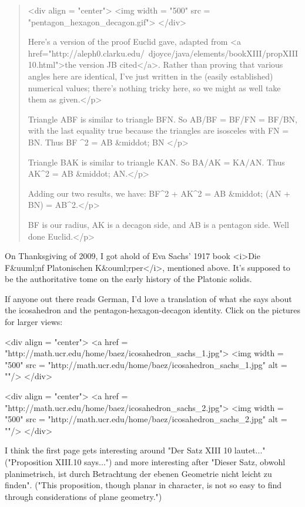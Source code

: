 \begin{quote}

<div align = "center">
<img width = "500" src = "pentagon_hexagon_decagon.gif">
</div>

Here's a version of the proof Euclid gave, adapted from <a
href="http://aleph0.clarku.edu/~djoyce/java/elements/bookXIII/propXIII10.html">the version JB cited</a>.  Rather than proving that various angles here
are identical, I've just written in the (easily established) numerical
values; there's nothing tricky here, so we might as well take them as
given.</p>


Triangle ABF is similar to triangle BFN.  So AB/BF = BF/FN = BF/BN, 
with the last equality true because the triangles are isosceles with 
FN = BN.  Thus BF ^{2} = AB &middot; BN </p>


Triangle BAK is similar to triangle KAN.  
So BA/AK = KA/AN.  Thus AK^{2} = AB &middot; AN.</p>


Adding our two results, we have:
BF^{2} + AK^{2} = AB &middot; (AN + BN) = AB^{2}.</p>


BF is our radius, AK is a decagon side, and AB is a pentagon
side. Well done Euclid.</p>

\end{quote}

On Thanksgiving of 2009, I got ahold of Eva Sachs' 1917 book <i>Die
F&uuml;nf Platonischen K&ouml;rper</i>, mentioned above.  It's
supposed to be the authoritative tome on the early history of the
Platonic solids.

If anyone out there reads German, I'd love a translation of what she says
about the icosahedron and the pentagon-hexagon-decagon identity.  Click on
the pictures for larger views:

<div align = "center">
<a href = "http://math.ucr.edu/home/baez/icosahedron_sachs_1.jpg">
<img width = "500" src = "http://math.ucr.edu/home/baez/icosahedron_sachs_1.jpg" alt = ""/>
</div>

<div align = "center">
<a href = "http://math.ucr.edu/home/baez/icosahedron_sachs_2.jpg">
<img width = "500" src = "http://math.ucr.edu/home/baez/icosahedron_sachs_2.jpg" alt =
""/>
</div>

I think the first page gets interesting around "Der Satz XIII 10 lautet..."
("Proposition XIII.10 says...") and more interesting after "Dieser Satz,
obwohl planimetrisch, ist durch Betrachtung der ebenen Geometrie nicht
leicht zu finden". ("This proposition, though planar in character, is not
so easy to find through considerations of plane geometry.")

